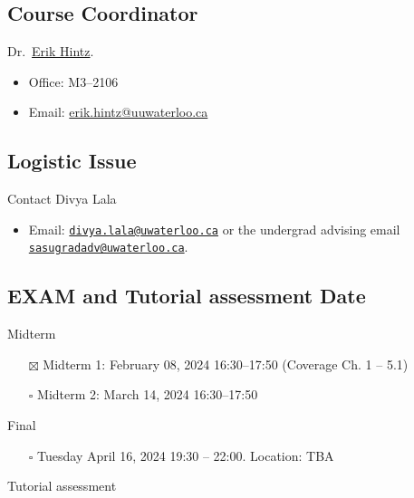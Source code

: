 \documentclass[
]{book}
\providecommand{\tightlist}{%
  \setlength{\itemsep}{0pt}\setlength{\parskip}{0pt}}
\theoremstyle{definition}
\theoremstyle{definition}
\theoremstyle{definition}
\theoremstyle{definition}
\theoremstyle{remark}
\begin{document}
\hypertarget{course-coordinator}{%
\subsection{Course Coordinator}\label{course-coordinator}}

Dr.~\href{https://uwaterloo.ca/scholar/ehintz}{Erik Hintz}.

\begin{itemize}
\tightlist
\item
  Office: M3--2106
\item
  Email: \href{mailto:erik.hintz@uwaterloo.ca}{erik.hintz@uuwaterloo.ca}
\end{itemize}

\hypertarget{logistic-issue}{%
\subsection{Logistic Issue}\label{logistic-issue}}

Contact Divya Lala

\begin{itemize}
\tightlist
\item
  Email: \href{mailto:divya.lala@uwaterloo.ca}{\nolinkurl{divya.lala@uwaterloo.ca}} or the undergrad advising email \href{mailto:sasugradadv@uwaterloo.ca}{\nolinkurl{sasugradadv@uwaterloo.ca}}.
\end{itemize}

\hypertarget{exam-and-tutorial-assessment-date}{%
\subsection{EXAM and Tutorial assessment Date}\label{exam-and-tutorial-assessment-date}}

Midterm

\begin{itemize}
\tightlist
\item[$\boxtimes$]
  Midterm 1: February 08, 2024 16:30--17:50 (Coverage Ch. 1 -- 5.1)
\item[$\square$]
  Midterm 2: March 14, 2024 16:30--17:50
\end{itemize}

Final

\begin{itemize}
\tightlist
\item[$\square$]
  Tuesday April 16, 2024 19:30 -- 22:00. Location: TBA
\end{itemize}

Tutorial assessment
\end{document}

